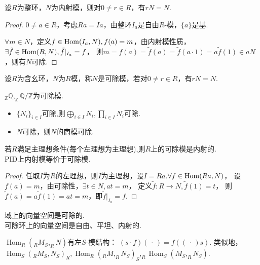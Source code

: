     \begin{proposition}
        设$R$为整环，$N$为内射模，则对$0\neq r\in R$，有$rN=N$.
    \end{proposition}
\begin{proof}
$0\neq a\in R$，考虑$Ra=Ia$，由整环$I_a$是自由$R$-模，$\{a\}$是基.

$\forall m \in N $，定义$f\in \operatorname{Hom}(I_a,N),f(a)=m$，由内射模性质，
$\exists \tilde{f}\in \operatorname{Hom}(R,N),\tilde{f}|_{I_a}=f$，
则$m=f(a)=\tilde{f}(a)=\tilde{f}(a\cdot1)=a\tilde{f}(1)\in aN$，则有$N$可除.
\end{proof}
    \begin{definition}
        设$R$为含幺环，$N$为$R$模，称$N$是可除模，若对$0\neq r\in R$，有$rN=N$.
    \end{definition}
    \begin{example}
        $_{\mathbb{Z}}\mathbb{Q},_{\mathbb{Z}}\mathbb{Q}/{\mathbb{Z}}$为可除模.
    \end{example}
    \begin{proposition}
        \begin{itemize}
            \item[1]$\{N_i\}_{i\in I}$可除,则$\bigoplus\limits_{i\in I}N_i,\prod \limits_{i\in I}N_i$可除.
            \item[2]$N$可除，则$N$的商模可除.
        \end{itemize}
    \end{proposition}
    \begin{proposition}
        若$R$满足主理想条件(每个左理想为主理想),则$R$上的可除模是内射的.\\
        PID上内射模等价于可除模.
    \end{proposition}
\begin{proof}
任取$I$为$R$的左理想，则$I$为主理想，设$I=Ra$.$\forall f\in \operatorname{Hom}(Ra,N)$，
设$f(a)=m$，由可除性，$\exists t \in N,at=m$，
定义$\tilde{f}:R\rightarrow N,\tilde{f}(1)=t$，
则$\tilde{f}(a)=a\tilde{f}(1)=at=m$，即$\tilde{f}|_{I_a}=f$.
\end{proof}
    \begin{example}
        域上的向量空间是可除的.\\
        可除环上的向量空间是自由、平坦、内射的.

    \end{example}
    \begin{proposition}
        $\operatorname{Hom}_R(_RM_S,_RN)$有左$S$-模结构：
        $(s\cdot f)(\,\cdot\,)=f((\,\cdot\,)s)$. 
        类似地，$\operatorname{Hom}_S(_RM_S,N_S)_R,\operatorname{Hom}_R(_RM,_RN_S)_S,_R\operatorname{Hom}_S(M_S,_RN_S)$.
    \end{proposition}
